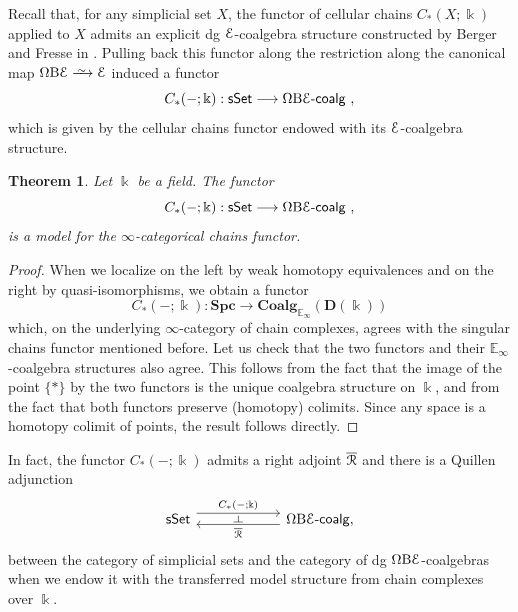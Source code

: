\documentclass{proc-l}
\renewcommand{\mathcal}{\EuScript}
\theoremstyle{plain}
\newtheorem{theorem}{Theorem}[section]
\theoremstyle{definition}
\theoremstyle{remark}
\newcommand{\qi}{\xrightarrow{ \,\smash{\raisebox{-0.65ex}{\ensuremath{\scriptstyle\sim}}}\,}}
\newcommand{\kk}{\Bbbk}
\begin{document}
Recall that, for any simplicial set $X$, the functor of cellular chains $C_*(X; \kk)$ applied to $X$ admits an explicit dg $\mathcal{E}$-coalgebra structure constructed by Berger and Fresse in \cite{BergerFresse}. Pulling back this functor along the restriction along the canonical map $\Omega \mathrm{B} \mathcal{E} \qi \mathcal{E}$ induced a functor
\[
C_*(-;\kk): \mathsf{sSet} \longrightarrow \Omega \mathrm{B} \mathcal{E}\text{-}\mathsf{coalg}~,
\]
which is given by the cellular chains functor endowed with its $\mathcal{E}$-coalgebra structure.

\begin{theorem}%
\label{Theorem:5.4}\label{thm: point-set model for the chains functor}
Let $\kk$ be a field. The functor
\[
C_*(-;\kk): \mathsf{sSet} \longrightarrow \Omega \mathrm{B} \mathcal{E}\text{-}\mathsf{coalg}~,
\]
is a model for the $\infty$-categorical chains functor.
\end{theorem}

\begin{proof}
When we localize on the left by weak homotopy equivalences and on the right by quasi-isomorphisms, we obtain a functor
\[
C_*(-;\kk): \mathbf{Spc} \longrightarrow \mathbf{Coalg}_{\mathbb{E}_\infty}(\mathbf{D}(\kk))
\]
which, on the underlying $\infty$-category of chain complexes, agrees with the singular chains functor mentioned before. Let us check that the two functors and their $\mathbb{E}_\infty$-coalgebra structures also agree. This follows from the fact that the image of the point $\{*\}$ by the two functors is the unique coalgebra structure on $\kk$, and from the fact that both functors preserve (homotopy) colimits. Since any space is a homotopy colimit of points, the result follows directly.
\end{proof}

In fact, the functor $C_*(-;\kk)$ admits a right adjoint $\overline{\mathcal{R}}$ and there is a Quillen adjunction
\[
\begin{tikzcd}[column sep=5pc,row sep=3pc]
\mathsf{sSet} \arrow[r, shift left=1.1ex, "C_*(-;\kk)"{name=F}] &\Omega \mathrm{B} \mathcal{E}\text{-}\mathsf{coalg}, \arrow[l, shift left=.75ex, "\overline{\mathcal{R}}"{name=U}]
\arrow[phantom, from=F, to=U, , "\dashv" rotate=-90]
\end{tikzcd}
\]
between the category of simplicial sets and the category of dg $\Omega\mathrm{B}\mathcal{E}$-coalgebras when we endow it with the transferred model structure from chain complexes over $\kk$.
\end{document}

